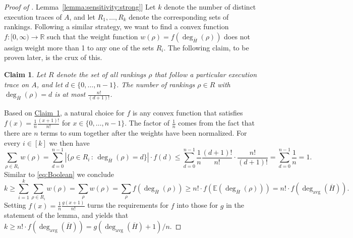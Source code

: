 \documentclass[11pt]{article}
\numberwithin{equation}{section}
\newtheorem{claim}[theorem]{Claim}
\theoremstyle{definition}
\theoremstyle{plain}
\newcommand{\R}{\mathbb R}
\newcommand{\expref}[2]{\hyperref[#2]{#1~\ref{#2}}}
\newcommand{\avgdeg}{\deg_\mathrm{avg}}
\newcommand{\Expect}{\mathbb{E}}
\newcommand{\ranking}{\rho}
\begin{document}
\begin{proof}[Proof of \expref{Lemma}{lemma:sensitivity:strong}]
Let $k$ denote the number of distinct execution traces of $A$, and let $R_1, \dots, R_k$ denote the corresponding sets of rankings. 
Following a similar strategy, we want to find a convex function $f: [0,\infty)\to \R$ such that the weight function $w(\ranking) = f(\deg_{\overline{H}}(\ranking))$ does not assign weight more than 1 to any one of the sets $R_i$. The following claim, to be proven later, is the crux of this.

\begin{claim}\label{claim:encoding}
Let $R$ denote the set of all rankings $\ranking$ that follow a particular execution trace on $A$, and let $d \in \{0,\dots,n-1\}$. The number of rankings $\ranking \in R$ with $\deg_{\overline{H}}(\ranking) = d$ is at most $\frac{n!}{(d+1)!}$.
\end{claim}

Based on \expref{Claim}{claim:encoding}, a natural choice for $f$ is any convex function that satisfies $f(x) = \frac{1}{n} \frac{(x+1)!}{n!}$ for $x \in \{0,\dots,n-1\}$. The factor of $\frac{1}{n}$ comes from the fact that there are $n$ terms to sum together after the weights have been normalized. For every $i \in [k]$ we then have
\[ \sum_{\ranking \in R_i} w(\ranking) = \sum_{d=0}^{n-1} \left| \{ \ranking \in R_i \, : \, \deg_{\overline{H}}(\ranking) = d \} \right| \cdot f(d) \le \sum_{d=0}^{n-1} \frac{1}{n} \frac{(d+1)!}{n!} \cdot \frac{n!}{(d+1)!} = \sum_{d=0}^{n-1} \frac{1}{n} = 1. \]
Similar to \eqref{eq:Boolean} we conclude
\begin{equation}\label{eq:lb:k}
k \ge \sum_{i=1}^k \sum_{\ranking \in R_i} w(\ranking) 
= \sum_\ranking w(\ranking)
= \sum_\ranking f(\deg_{\overline{H}}(\ranking)) \ge n! \cdot f(\Expect(\deg_{\overline{H}}(\ranking))) = n! \cdot f(\avgdeg(\overline{H})). 
\end{equation}
Setting $f(x) = \frac{1}{n} \frac{g(x+1)}{n!}$ turns the requirements for $f$ into those for $g$ in the statement of the lemma, and yields that $k \ge n! \cdot f(\avgdeg(\overline{H})) = g(\avgdeg(\overline{H})+1)/n$. 
\end{proof}
\end{document}
